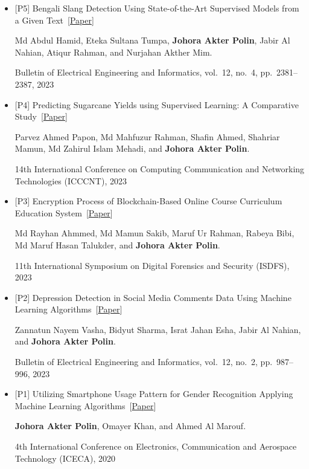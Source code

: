 \documentclass[11pt,letterpaper]{article}
\newenvironment{numbered}[1][3.1em]
  {\begin{itemize}[leftmargin=#1, labelwidth=\dimexpr#1-0.5em\relax,
                   labelsep=0.5em, align=left, itemsep=3pt, topsep=2pt]}
  {\end{itemize}}
\newcommand{\me}{\textbf{Johora Akter Polin}}
\newcommand{\paper}[1]{~\mbox{[\href{#1}{Paper}]}}
\begin{document}
{\begin{numbered}
    Bangladesh\paper{https://doi.org/10.11591/eei.v13i1.6073}\par\nobreak
    \me, Nahid Hasan, Md.~Tarek Habib, Atiqur Rahman, Zannatun Nayem Vasha, and
    Bidyut Sharma.\par\nobreak
    Bulletin of Electrical Engineering and Informatics, vol.~13, no.~1,
    pp.~619--627, 2024
  \item[{[P5]}] Bengali Slang Detection Using State-of-the-Art Supervised Models
    from a Given Text\paper{https://doi.org/10.11591/eei.v12i4.4743}\par\nobreak
    Md Abdul Hamid, Eteka Sultana Tumpa, \me, Jabir Al Nahian, Atiqur Rahman, and
    Nurjahan Akther Mim.\par\nobreak
    Bulletin of Electrical Engineering and Informatics, vol.~12, no.~4,
    pp.~2381--2387, 2023
  \item[{[P4]}] Predicting Sugarcane Yields using Supervised Learning: A
    Comparative Study\paper{https://ieeexplore.ieee.org/abstract/document/10307590}\par\nobreak
    Parvez Ahmed Papon, Md Mahfuzur Rahman, Shafin Ahmed, Shahriar Mamun,
    Md Zahirul Islam Mehadi, and \me.\par\nobreak
    14th International Conference on Computing Communication and Networking
    Technologies (ICCCNT), 2023
  \item[{[P3]}] Encryption Process of Blockchain-Based Online Course Curriculum
    Education System\paper{https://ieeexplore.ieee.org/abstract/document/10131770}\par\nobreak
    Md Rayhan Ahmmed, Md Mamun Sakib, Maruf Ur Rahman, Rabeya Bibi, Md Maruf
    Hasan Talukder, and \me.\par\nobreak
    11th International Symposium on Digital Forensics and Security (ISDFS), 2023
  \item[{[P2]}] Depression Detection in Social Media Comments Data Using Machine
    Learning Algorithms\paper{https://doi.org/10.11591/eei.v12i2.4182}\par\nobreak
    Zannatun Nayem Vasha, Bidyut Sharma, Israt Jahan Esha, Jabir Al Nahian, and
    \me.\par\nobreak
    Bulletin of Electrical Engineering and Informatics, vol.~12, no.~2,
    pp.~987--996, 2023
  \item[{[P1]}] Utilizing Smartphone Usage Pattern for Gender Recognition
    Applying Machine Learning
    Algorithms\paper{https://ieeexplore.ieee.org/abstract/document/9297407}\par\nobreak
    \me, Omayer Khan, and Ahmed Al Marouf.\par\nobreak
    4th International Conference on Electronics, Communication and Aerospace
    Technology (ICECA), 2020
\end{numbered}}
\end{document}
